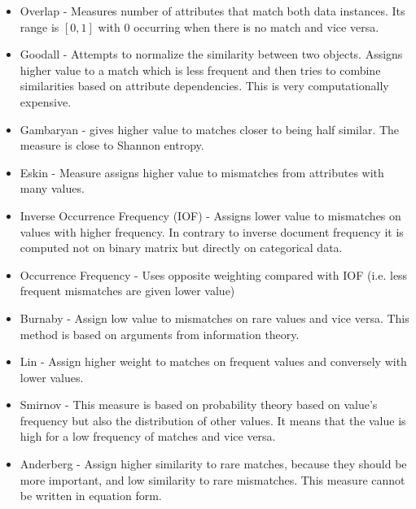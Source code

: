 \begin{itemize}
\item Overlap - Measures number of attributes that match both data instances. Its range is $[0,1]$ with 0 occurring when there is no match and vice versa.
\item Goodall - Attempts to normalize the similarity between two objects. Assigns higher value to a match which is less frequent and then tries to combine similarities based on attribute dependencies. This is very computationally expensive.
\item Gambaryan - gives higher value to matches closer to being half similar. The measure is close to Shannon entropy. 
\item Eskin - Measure assigns higher value to mismatches from attributes with many values.
\item Inverse Occurrence Frequency (IOF) - Assigns lower value to mismatches on values with higher frequency. In contrary to inverse document frequency it is computed not on binary matrix but directly on categorical data.
\item Occurrence Frequency - Uses opposite weighting compared with IOF (i.e. less frequent mismatches are given lower value)
\item Burnaby - Assign low value to mismatches on rare values and vice versa. This method is based on arguments from information theory.
\item Lin - Assign higher weight to matches on frequent values and conversely with lower values.
\item Smirnov - This measure is based on probability theory based on value's frequency but also the distribution of other values. It means that the value is high for a low frequency of matches and vice versa.
\item Anderberg - Assign higher similarity to rare matches, because they should be more important, and low similarity to rare mismatches. This measure cannot be written in equation form.

\end{itemize}

